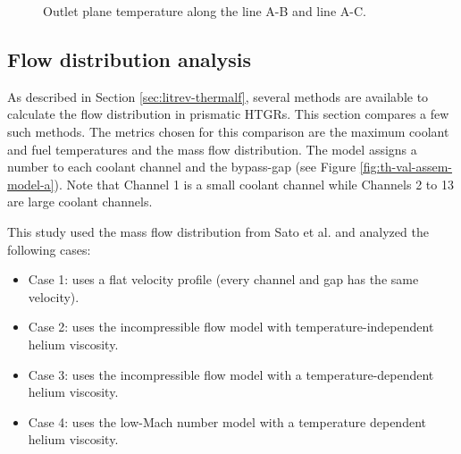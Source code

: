 \begin{figure}[htbp!]
  \centering
  \hfill
  \caption{Outlet plane temperature along the line A-B and line A-C.}
  \label{fig:th-val-assem-temps}
\end{figure}

\subsection{Flow distribution analysis}
\label{sec:flowdistrib}

As described in Section \ref{sec:litrev-thermalf}, several methods are available to calculate the flow distribution in prismatic HTGRs.
This section compares a few such methods.
The metrics chosen for this comparison are the maximum coolant and fuel temperatures and the mass flow distribution.
The model assigns a number to each coolant channel and the bypass-gap (see Figure \ref{fig:th-val-assem-model-a}).
Note that Channel 1 is a small coolant channel while Channels 2 to 13 are large coolant channels.

This study used the mass flow distribution from Sato et al. \cite{sato_computational_2010} and analyzed the following cases:
\begin{itemize}
    \item Case 1: uses a flat velocity profile (every channel and gap has the same velocity).
    \item Case 2: uses the incompressible flow model with temperature-independent helium viscosity.
    \item Case 3: uses the incompressible flow model with a temperature-dependent helium viscosity.
    \item Case 4: uses the low-Mach number model with a temperature dependent helium viscosity.
\end{itemize}

